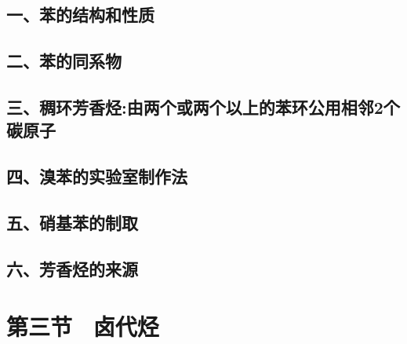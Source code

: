 \documentclass{book}
\begin{document}
\subsection{一、苯的结构和性质}

\subsection{二、苯的同系物}

\subsection{三、稠环芳香烃:由两个或两个以上的苯环公用相邻2个碳原子}

\subsection{四、溴苯的实验室制作法}

\subsection{五、\textbf{硝基苯}的制取}

\subsection{六、芳香烃的来源}

\section{第三节 \ 卤代烃}
\end{document}
